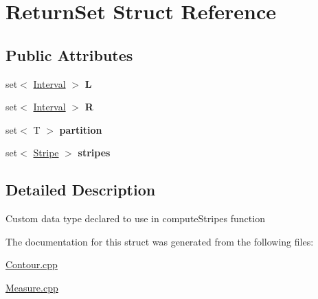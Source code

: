 \hypertarget{structReturnSet}{}\section{Return\+Set Struct Reference}
\label{structReturnSet}
\subsection*{Public Attributes}
\begin{DoxyCompactItemize}
\item 
\mbox{\label{structReturnSet_ae1af7d2d328b276d8ac012066dcd68df}} 
set$<$ \hyperlink{classInterval}{Interval} $>$ {\bfseries L}
\item 
\mbox{\label{structReturnSet_a3112c947cfdf4eac12d3bd5752463593}} 
set$<$ \hyperlink{classInterval}{Interval} $>$ {\bfseries R}
\item 
\mbox{\label{structReturnSet_a11b26e3e91f48b695df69b3ba23b8dd5}} 
set$<$ T $>$ {\bfseries partition}
\item 
\mbox{\label{structReturnSet_ada4487ddcca104f88ab6dc5e3b9a2946}} 
set$<$ \hyperlink{classStripe}{Stripe} $>$ {\bfseries stripes}
\end{DoxyCompactItemize}


\subsection{Detailed Description}
Custom data type declared to use in compute\+Stripes function 

The documentation for this struct was generated from the following files\+:\begin{DoxyCompactItemize}
\item 
\hyperlink{Contour_8cpp}{Contour.\+cpp}\item 
\hyperlink{Measure_8cpp}{Measure.\+cpp}\end{DoxyCompactItemize}
